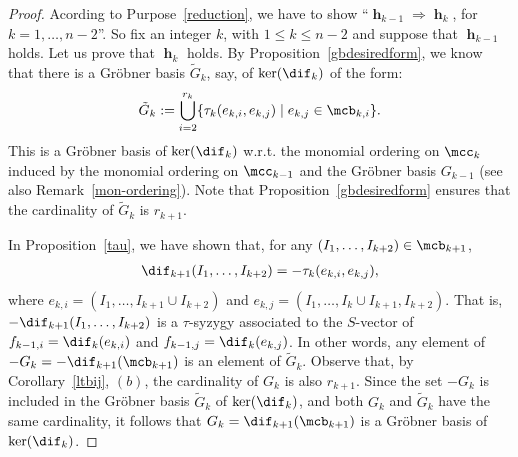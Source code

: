 \begin{proof} Acording to Purpose~\ref{reduction},
we have to show ``$\mbfh_{k-1}\Rightarrow \mbfh_{k}$, for $k=1,\ldots
,n-2$''. So fix an integer $k$, with $1\leq k\leq n-2$ and suppose
that $\mbfh_{k-1}$ holds. Let us prove that $\mbfh_k$ holds. By
Proposition~\ref{gbdesiredform}, we know that there is a Gr\"obner
basis $\tilde{G}_k$, say, of $\ker(\dif_{k})$ of the form: 
\begin{eqnarray}\label{groebf}
\tilde{G}_k:=\bigcup_{i=2}^{r_{k}}\{ \tau_{k}(e_{k,i},e_{k,j})\mid
e_{k,j}\in\mcb_{k,i}\}.
\end{eqnarray}
This is a Gr\"obner basis of $\ker(\dif_{k})$ w.r.t. the monomial
ordering on $\mcc_k$ induced by the monomial ordering on $\mcc_{k-1}$
and the Gr\"obner basis $G_{k-1}$ (see also
Remark~\ref{mon-ordering}). Note that Proposition~\ref{gbdesiredform}
ensures that the cardinality of $\tilde{G}_k$ is $r_{k+1}$.

In Proposition~\ref{tau}, we have shown that, for any $(I_1,\ldots
,I_{k+2})\in\mcb_{k+1}$,
\begin{eqnarray*}
\dif_{k+1}(I_1,\ldots,I_{k+2})=-\tau_{k}(e_{k,i},e_{k,j}),
\end{eqnarray*}
where $e_{k,i}=(I_1,\ldots ,I_{k+1}\cup I_{k+2})$ and
$e_{k,j}=(I_1,\ldots,I_{k}\cup I_{k+1},I_{k+2})$. That is,
$-\dif_{k+1}(I_1,\ldots,I_{k+2})$ is a $\tau$-syzygy associated to the
$S$-vector of $f_{k-1,i}=\dif_{k}(e_{k,i})$ and
$f_{k-1,j}=\dif_{k}(e_{k,j})$. In other words, any element of
$-G_{k}=-\dif_{k+1}(\mcb_{k+1})$ is an element of
$\tilde{G}_k$. Observe that, by Corollary~\ref{ltbij}, $(b)$, the
cardinality of $G_k$ is also $r_{k+1}$. Since the set $-G_{k}$ is
included in the Gr\"obner basis $\tilde{G}_k$ of $\ker(\dif_k)$, and
both $G_k$ and $\tilde{G}_k$ have the same cardinality, it follows
that $G_k=\dif_{k+1}(\mcb_{k+1})$ is a Gr\"obner basis of
$\ker(\dif_{k})$.


\end{proof}
